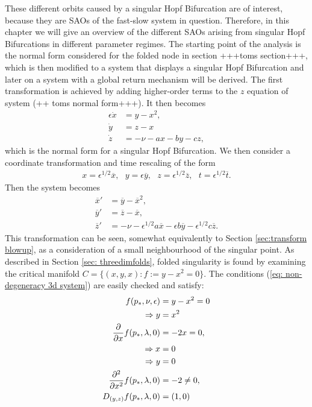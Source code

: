 These different orbits caused by a singular Hopf Bifurcation are of interest, because they are SAOs of the fast-slow system in question. Therefore, in this chapter we will give an overview of the different SAOs arising from singular Hopf Bifurcations in different parameter regimes. 
The starting point of the analysis is the normal form considered for the folded node in section +++toms section+++, which is then modified to a system that displays a singular Hopf Bifurcation and later on a system with a global return mechanism will be derived.
The first transformation is achieved by adding higher-order terms to the $z$ equation of system (++ toms normal form+++). It then becomes
\begin{align*}
\epsilon \dot{x} &= y - x^2, \\
\dot{y} &= z - x \\
\dot{z} &= - \nu -ax - by - cz,
\end{align*}
which is the normal form for a singular Hopf Bifurcation.
We then consider a coordinate transformation and time rescaling of the form 
\begin{align*}
x = \epsilon^{1/2}\overline{x}, \ \ \ y= \epsilon \overline{y},  \ \ \ z = \epsilon^{1/2} \overline{z},\ \ \  t= \epsilon^{1/2} \overline{t}.
\end{align*}
Then the system becomes
\begin{align} \label{sysepsilonenvir}
\overline{x}' &= \overline{y} - \overline{x}^2, \\
\overline{y}' &= \overline{z} - \overline{x}, \\
\overline{z}' &= - \nu - \epsilon^{1/2} a \overline{x} - \epsilon b \overline{y} - \epsilon^{1/2} c \overline{z}.
\end{align}
This transformation can be seen, somewhat equivalently to Section \ref{sec:transform blowup}, as a consideration of a small neighbourhood of the singular point.
As described in Section \ref{sec: threedimfolds}, folded singularity is found by examining the critical manifold $C= \{ (x,y,x) : f:=y-x^2 =0 \}$. The conditions (\ref{eq: non-degeneracy 3d system}) are easily checked and satisfy:
\begin{align*}
f(p_*, \nu, \epsilon)&= y- x^2 =0 \\
\Rightarrow y &= x^2\\
\pd{}{x}f(p_*,\lambda,0) &= -2x = 0,\\
\Rightarrow x &= 0\\ 
\Rightarrow y &=0\\
\pd{^2}{x^2}f(p_*,\lambda,0) &= -2 \neq 0,\\
D_{(y,z)}f(p_*,\lambda,0) &= (1,0)
\end{align*}
